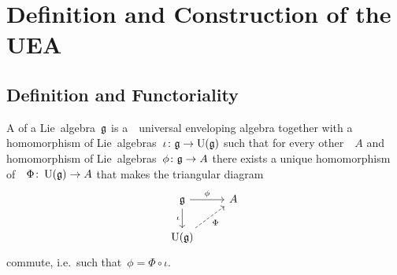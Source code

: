 \section{Definition and Construction of the UEA}





\subsection{Definition and Functoriality}


\begin{definition}
  A  of a Lie~algebra~$\mathfrak{g}$ is a~\algebra{$\kf$}~\gls*{universal enveloping algebra} together with a homomorphism of Lie~algebras~$\iota \colon \mathfrak{g} \to \operatorname{U}(\mathfrak{g})$ such that for every other~{\algebra{$\kf$}}~$A$ and homomorphism of Lie~algebras~$\phi \colon \mathfrak{g} \to A$ there exists a unique homomorphism of~\algebras{$\kf$}~$\Phi \colon \operatorname{U}(\mathfrak{g}) \to A$ that makes the triangular diagram
  \[
    \begin{tikzcd}
      \glie
      \arrow{r}[above]{\phi}
      \arrow{d}[left]{\iota}
      &
      A
      \\
      \Univ(\glie)
      \arrow[dashed]{ur}[below right]{\Phi}
      &
      {}
    \end{tikzcd}
  \]
  commute, i.e.\ such that~$\phi = \Phi \circ \iota$.
\end{definition}


